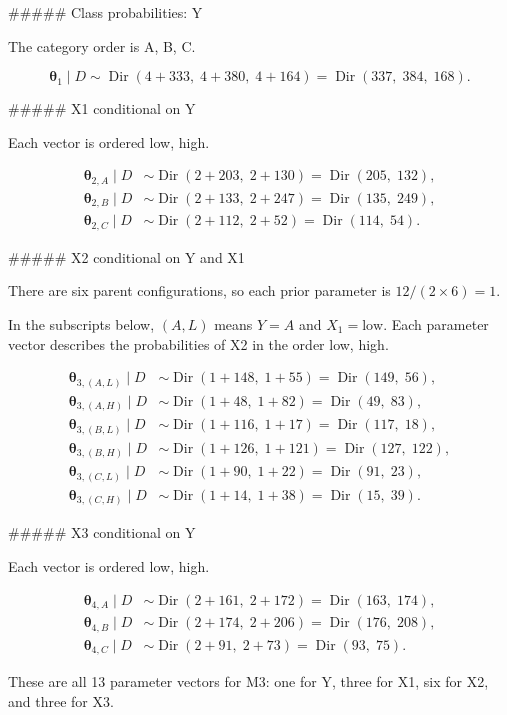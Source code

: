##### Class probabilities: Y

The category order is A, B, C.

$$
\boldsymbol{\theta}_1\mid D
\sim \operatorname{Dir}(4+333,\;4+380,\;4+164)
=\operatorname{Dir}(337,\;384,\;168).
$$

##### X1 conditional on Y

Each vector is ordered low, high.

$$
\begin{aligned}
\boldsymbol{\theta}_{2,A}\mid D
&\sim \operatorname{Dir}(2+203,\;2+130)
=\operatorname{Dir}(205,\;132),\\
\boldsymbol{\theta}_{2,B}\mid D
&\sim \operatorname{Dir}(2+133,\;2+247)
=\operatorname{Dir}(135,\;249),\\
\boldsymbol{\theta}_{2,C}\mid D
&\sim \operatorname{Dir}(2+112,\;2+52)
=\operatorname{Dir}(114,\;54).
\end{aligned}
$$

##### X2 conditional on Y and X1

There are six parent configurations, so each prior parameter
is $12/(2\times6)=1$.

In the subscripts below, $(A,L)$ means $Y=A$ and
$X_1=\mathrm{low}$. Each parameter vector describes the
probabilities of X2 in the order low, high.

$$
\begin{aligned}
\boldsymbol{\theta}_{3,(A,L)}\mid D
&\sim \operatorname{Dir}(1+148,\;1+55)
=\operatorname{Dir}(149,\;56),\\
\boldsymbol{\theta}_{3,(A,H)}\mid D
&\sim \operatorname{Dir}(1+48,\;1+82)
=\operatorname{Dir}(49,\;83),\\
\boldsymbol{\theta}_{3,(B,L)}\mid D
&\sim \operatorname{Dir}(1+116,\;1+17)
=\operatorname{Dir}(117,\;18),\\
\boldsymbol{\theta}_{3,(B,H)}\mid D
&\sim \operatorname{Dir}(1+126,\;1+121)
=\operatorname{Dir}(127,\;122),\\
\boldsymbol{\theta}_{3,(C,L)}\mid D
&\sim \operatorname{Dir}(1+90,\;1+22)
=\operatorname{Dir}(91,\;23),\\
\boldsymbol{\theta}_{3,(C,H)}\mid D
&\sim \operatorname{Dir}(1+14,\;1+38)
=\operatorname{Dir}(15,\;39).
\end{aligned}
$$

##### X3 conditional on Y

Each vector is ordered low, high.

$$
\begin{aligned}
\boldsymbol{\theta}_{4,A}\mid D
&\sim \operatorname{Dir}(2+161,\;2+172)
=\operatorname{Dir}(163,\;174),\\
\boldsymbol{\theta}_{4,B}\mid D
&\sim \operatorname{Dir}(2+174,\;2+206)
=\operatorname{Dir}(176,\;208),\\
\boldsymbol{\theta}_{4,C}\mid D
&\sim \operatorname{Dir}(2+91,\;2+73)
=\operatorname{Dir}(93,\;75).
\end{aligned}
$$

These are all 13 parameter vectors for M3:
one for Y, three for X1, six for X2, and three for X3.
